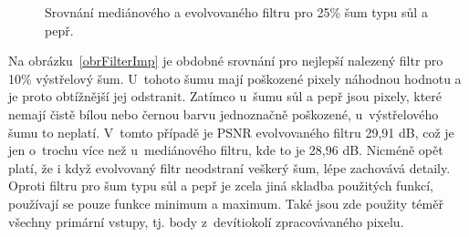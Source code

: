 \begin{figure}[hbt]
    \centering
    \hfill
    \hfill
    \caption{Srovnání mediánového a evolvovaného filtru pro 25\% šum typu sůl a pepř.}
    \label{obrFilterSP}
\end{figure}

Na obrázku~\ref{obrFilterImp} je obdobné srovnání pro nejlepší nalezený filtr pro 10\% výstřelový šum. U~tohoto šumu mají poškozené pixely náhodnou hodnotu a je proto obtížnější jej odstranit. Zatímco u~šumu sůl a pepř jsou pixely, které nemají čistě bílou nebo černou barvu jednoznačně poškozené, u~výstřelového šumu to neplatí. V~tomto případě je PSNR evolvovaného filtru 29,91 dB, což je jen o~trochu více než u~mediánového filtru, kde to je 28,96 dB. Nicméně opět platí, že i když evolvovaný filtr neodstraní veškerý šum, lépe zachovává detaily. Oproti filtru pro šum typu sůl a pepř je zcela jiná skladba použitých funkcí, používají se pouze funkce minimum a maximum. Také jsou zde použity téměř všechny primární vstupy, tj. body z~devítiokolí zpracovávaného pixelu.

